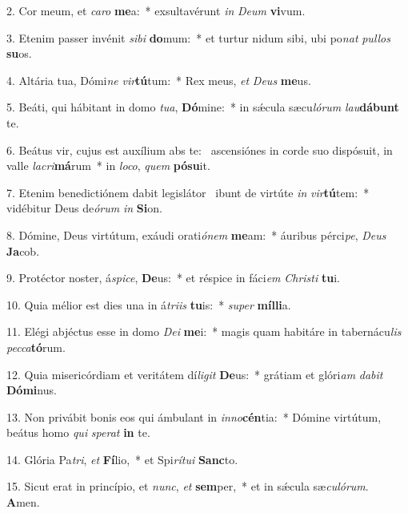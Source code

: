 2. Cor meum, et \textit{ca}\textit{ro} \textbf{me}a:~*  exsultavérunt \textit{in} \textit{De}\textit{um} \textbf{vi}vum.\

3. Etenim passer invénit \textit{si}\textit{bi} \textbf{do}mum:~*  et turtur nidum sibi, ubi po\textit{nat} \textit{pul}\textit{los} \textbf{su}os.\

4. Altária tua, Dómi\textit{ne} \textit{vir}\textbf{tú}tum:~*  Rex meus, \textit{et} \textit{De}\textit{us} \textbf{me}us.\

5. Beáti, qui hábitant in domo \textit{tu}\textit{a}, \textbf{Dó}mine:~*  in sǽcula sæcu\textit{ló}\textit{rum} \textit{lau}\textbf{dá}\textbf{bunt} te.\

6. Beátus vir, cujus est auxílium abs te: \dag\  ascensiónes in corde suo dispósuit, in valle \textit{la}\textit{cri}\textbf{má}rum~*  in \textit{lo}\textit{co}, \textit{quem} \textbf{pó}\textbf{su}it.\

7. Etenim benedictiónem dabit legislátor \dag\  ibunt de virtúte \textit{in} \textit{vir}\textbf{tú}tem:~*  vidébitur Deus de\textit{ó}\textit{rum} \textit{in} \textbf{Si}on.\

8. Dómine, Deus virtútum, exáudi orati\textit{ó}\textit{nem} \textbf{me}am:~*  áuribus pérci\textit{pe}, \textit{De}\textit{us} \textbf{Ja}cob.\

9. Protéctor noster, á\textit{spi}\textit{ce}, \textbf{De}us:~*  et réspice in fáci\textit{em} \textit{Chris}\textit{ti} \textbf{tu}i.\

10. Quia mélior est dies una in á\textit{tri}\textit{is} \textbf{tu}is:~*  \textit{su}\textit{per} \textbf{míl}\textbf{li}a.\

11. Elégi abjéctus esse in domo \textit{De}\textit{i} \textbf{me}i:~*  magis quam habitáre in tabernácu\textit{lis} \textit{pec}\textit{ca}\textbf{tó}rum.\

12. Quia misericórdiam et veritátem dí\textit{li}\textit{git} \textbf{De}us:~*  grátiam et glóri\textit{am} \textit{da}\textit{bit} \textbf{Dó}\textbf{mi}nus.\

13. Non privábit bonis eos qui ámbulant in \textit{in}\textit{no}\textbf{cén}tia:~*  Dómine virtútum, beátus homo \textit{qui} \textit{spe}\textit{rat} \textbf{in} te.\

14. Glória Pa\textit{tri}, \textit{et} \textbf{Fí}lio,~*  et Spi\textit{rí}\textit{tu}\textit{i} \textbf{Sanc}to.\

15. Sicut erat in princípio, et \textit{nunc}, \textit{et} \textbf{sem}per,~*  et in sǽcula sæ\textit{cu}\textit{ló}\textit{rum}. \textbf{A}men.\

